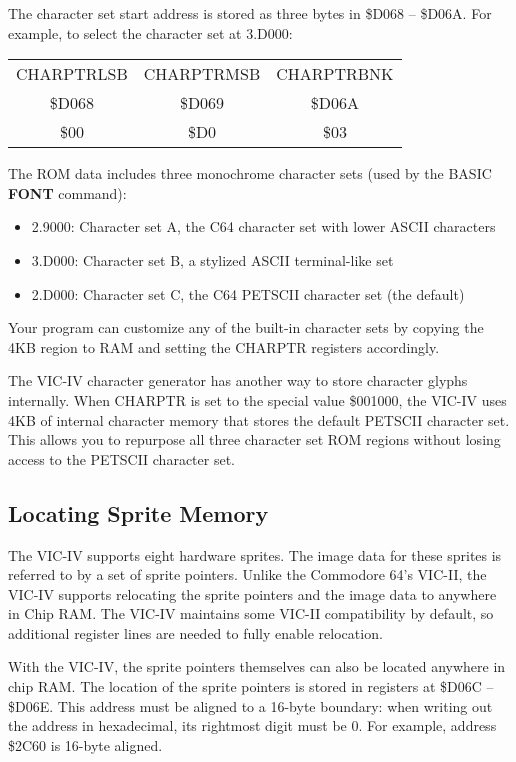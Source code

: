 The character set start address is stored as three bytes in \$D068 -- \$D06A.
For example, to select the character set at 3.D000:

\begin{center}
\begin{tabular}{|c|c|c|}
\hline
CHARPTRLSB & CHARPTRMSB & CHARPTRBNK \\
\$D068 & \$D069 & \$D06A \\
\hline
\$00 & \$D0 & \$03 \\
\hline
\end{tabular}
\end{center}

The ROM data includes three monochrome character sets (used by the BASIC {\bf
FONT} command):

\begin{itemize}
\item 2.9000: Character set A, the C64 character set with lower ASCII characters
\item 3.D000: Character set B, a stylized ASCII terminal-like set
\item 2.D000: Character set C, the C64 PETSCII character set (the default)
\end{itemize}

Your program can customize any of the built-in character sets by copying the
4KB region to RAM and setting the CHARPTR registers accordingly.

The VIC-IV character generator has another way to store character glyphs
internally. When CHARPTR is set to the special value \$001000, the VIC-IV uses
4KB of internal character memory that stores the default PETSCII character set. This
allows you to repurpose all three character set ROM regions without losing access
to the PETSCII character set.

\subsection{Locating Sprite Memory}

The VIC-IV supports eight hardware sprites. The image data for these sprites is
referred to by a set of sprite pointers. Unlike the Commodore 64's VIC-II, the
VIC-IV supports relocating the sprite pointers and the image data to anywhere
in Chip RAM. The VIC-IV maintains some VIC-II compatibility by default, so
additional register lines are needed to fully enable relocation.

With the VIC-IV, the sprite pointers themselves can also be located anywhere
in chip RAM. The location of the sprite pointers is stored in registers at
\$D06C -- \$D06E. This address must be aligned to a 16-byte boundary: when
writing out the address in hexadecimal, its rightmost digit must be 0. For
example, address \$2C60 is 16-byte aligned.

